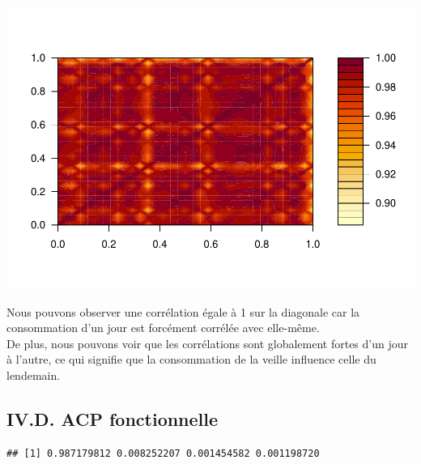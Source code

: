 \documentclass[
]{article}
\newenvironment{Shaded}{\begin{snugshade}}{\end{snugshade}}
\newcommand{\AttributeTok}[1]{\textcolor[rgb]{0.77,0.63,0.00}{#1}}
\newcommand{\ConstantTok}[1]{\textcolor[rgb]{0.00,0.00,0.00}{#1}}
\newcommand{\DecValTok}[1]{\textcolor[rgb]{0.00,0.00,0.81}{#1}}
\newcommand{\FunctionTok}[1]{\textcolor[rgb]{0.00,0.00,0.00}{#1}}
\newcommand{\NormalTok}[1]{#1}
\newcommand{\OtherTok}[1]{\textcolor[rgb]{0.56,0.35,0.01}{#1}}
\newcommand{\SpecialCharTok}[1]{\textcolor[rgb]{0.00,0.00,0.00}{#1}}
\begin{document}
\includegraphics{Projet_CHESNAIS_GUIBERT_files/figure-latex/unnamed-chunk-43-1.pdf}

Nous pouvons observer une corrélation égale à 1 sur la diagonale car la
consommation d'un jour est forcément corrélée avec elle-même.\\
De plus, nous pouvons voir que les corrélations sont globalement fortes
d'un jour à l'autre, ce qui signifie que la consommation de la veille
influence celle du lendemain.

\hypertarget{iv.d.-acp-fonctionnelle}{%
\subsection{IV.D. ACP fonctionnelle}\label{iv.d.-acp-fonctionnelle}}

\begin{Shaded}
\end{Shaded}

\begin{verbatim}
## [1] 0.987179812 0.008252207 0.001454582 0.001198720
\end{verbatim}

\begin{Shaded}
\end{Shaded}
\end{document}
